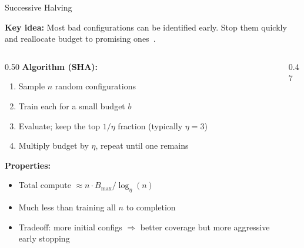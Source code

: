 \begin{frame}{Successive Halving}

  \textbf{Key idea:} Most bad configurations can be identified early.
  Stop them quickly and reallocate budget to promising ones~\cite{li2017hyperband}.

  \vspace{0.3em}
  \begin{columns}[T]
    \begin{column}{0.50\textwidth}
      \textbf{Algorithm (SHA):}
      \begin{enumerate}
        \item Sample $n$ random configurations
        \item Train each for a small budget $b$
        \item Evaluate; keep the top $1/\eta$ fraction (typically $\eta = 3$)
        \item Multiply budget by $\eta$, repeat until one remains
      \end{enumerate}

      \vspace{0.3em}
      \textbf{Properties:}
      \begin{itemize}
        \item Total compute $\approx n \cdot B_{\max} / \log_\eta(n)$
        \item Much less than training all $n$ to completion
        \item \alert{Tradeoff:} more initial configs $\Rightarrow$ better coverage but more aggressive early stopping
      \end{itemize}
    \end{column}
    \begin{column}{0.47\textwidth}
      \begin{center}
\end{center}
\end{column}
\end{columns}
\end{frame}
